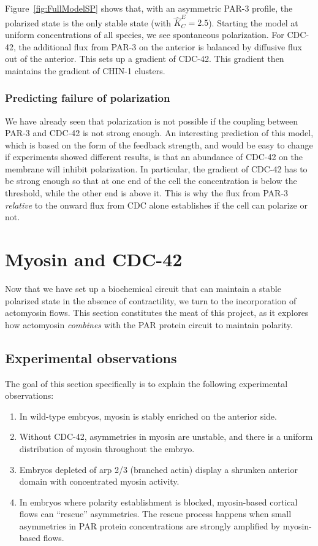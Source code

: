 \documentclass[11pt]{article}
\newcommand{\6}[1]{#1_{\text{6}}}
\newcommand{\3}[1]{#1_{\text{3}}}
\newcommand{\C}[1]{#1_C}
\begin{document}
Figure\ \ref{fig:FullModelSP} shows that, with an asymmetric PAR-3 profile, the polarized state is the only stable state (with $\C{\hat{K}}^E =2.5$). Starting the model at uniform concentrations of all species, we see spontaneous polarization. For CDC-42, the additional flux from PAR-3 on the anterior is balanced by diffusive flux out of the anterior. This sets up a gradient of CDC-42. This gradient then maintains the gradient of CHIN-1 clusters.

\subsubsection{Predicting failure of polarization}
We have already seen that polarization is not possible if the coupling between PAR-3 and CDC-42 is not strong enough. An interesting prediction of this model, which is based on the form of the feedback strength, and would be easy to change if experiments showed different results, is that an abundance of CDC-42 on the membrane will inhibit polarization. In particular, the gradient of CDC-42 has to be strong enough so that at one end of the cell the concentration is below the threshold, while the other end is above it. This is why the flux from PAR-3 \emph{relative} to the onward flux from CDC alone establishes if the cell can polarize or not.
\fi

\section{Myosin and CDC-42}
Now that we have set up a biochemical circuit that can maintain a stable polarized state in the absence of contractility, we turn to the incorporation of actomyosin flows. This section constitutes the meat of this project, as it explores how actomyosin \emph{combines} with the PAR protein circuit to maintain polarity.

\subsection{Experimental observations \label{sec:expobs}}
The goal of this section specifically is to explain the following experimental observations:
\begin{enumerate}
\item In wild-type embryos, myosin is stably enriched on the anterior side. 
\item Without CDC-42, asymmetries in myosin are unstable, and there is a uniform distribution of myosin throughout the embryo. 
\item Embryos depleted of arp 2/3 (branched actin) display a shrunken anterior domain with concentrated myosin activity.
\item In embryos where polarity establishment is blocked, myosin-based cortical flows can ``rescue'' asymmetries. The rescue process happens when small asymmetries in PAR protein concentrations are strongly amplified by myosin-based flows.
\end{enumerate}
\end{document}

